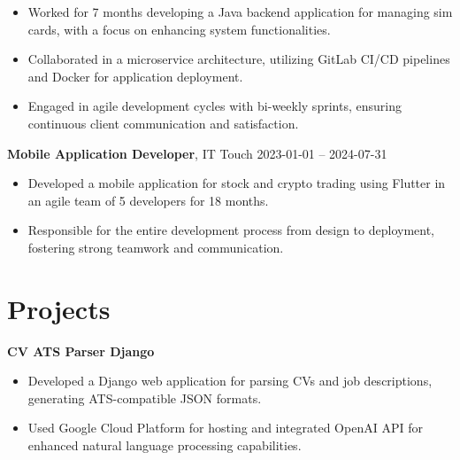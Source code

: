 \documentclass[10pt, letterpaper]{article}
\begin{document}
\begin{itemize}
    
    \item Worked for 7 months developing a Java backend application for managing sim cards, with a focus on enhancing system functionalities.
    
    \item Collaborated in a microservice architecture, utilizing GitLab CI/CD pipelines and Docker for application deployment.
    
    \item Engaged in agile development cycles with bi-weekly sprints, ensuring continuous client communication and satisfaction.
    
\end{itemize}

\begin{paracol}{2}
\noindent\textbf{Mobile Application Developer}, IT Touch \switchcolumn
\hfill 2023-01-01 -- 2024-07-31
\end{paracol}

\vspace{5pt}

\begin{itemize}
    
    \item Developed a mobile application for stock and crypto trading using Flutter in an agile team of 5 developers for 18 months.
    
    \item Responsible for the entire development process from design to deployment, fostering strong teamwork and communication.
    
\end{itemize}


\section*{Projects}

\noindent\textbf{CV ATS Parser Django}

\vspace{5pt}
\begin{itemize}
    
    \item Developed a Django web application for parsing CVs and job descriptions, generating ATS-compatible JSON formats.
    
    \item Used Google Cloud Platform for hosting and integrated OpenAI API for enhanced natural language processing capabilities.
    
\end{itemize}
\end{document}
